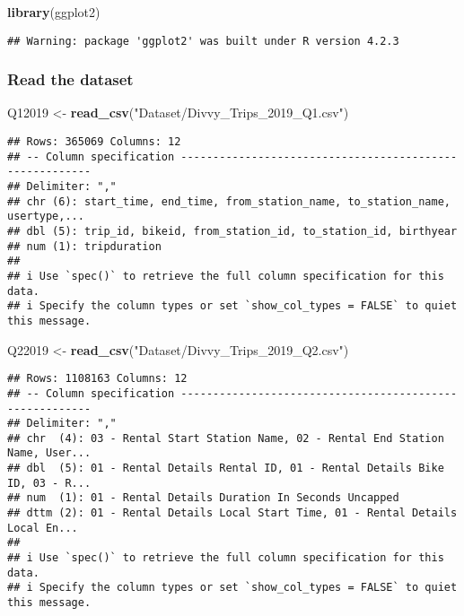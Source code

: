 \documentclass[
]{article}
\newenvironment{Shaded}{\begin{snugshade}}{\end{snugshade}}
\newcommand{\FunctionTok}[1]{\textcolor[rgb]{0.13,0.29,0.53}{\textbf{#1}}}
\newcommand{\NormalTok}[1]{#1}
\newcommand{\OtherTok}[1]{\textcolor[rgb]{0.56,0.35,0.01}{#1}}
\newcommand{\StringTok}[1]{\textcolor[rgb]{0.31,0.60,0.02}{#1}}
\begin{document}
\begin{Shaded}
\begin{Highlighting}[]
\FunctionTok{library}\NormalTok{(ggplot2)}
\end{Highlighting}
\end{Shaded}

\begin{verbatim}
## Warning: package 'ggplot2' was built under R version 4.2.3
\end{verbatim}

\hypertarget{read-the-dataset}{%
\subsubsection{Read the dataset}\label{read-the-dataset}}

\begin{Shaded}
\begin{Highlighting}[]
\NormalTok{Q12019 }\OtherTok{\textless{}{-}} \FunctionTok{read\_csv}\NormalTok{(}\StringTok{"Dataset/Divvy\_Trips\_2019\_Q1.csv"}\NormalTok{)}
\end{Highlighting}
\end{Shaded}

\begin{verbatim}
## Rows: 365069 Columns: 12
## -- Column specification --------------------------------------------------------
## Delimiter: ","
## chr (6): start_time, end_time, from_station_name, to_station_name, usertype,...
## dbl (5): trip_id, bikeid, from_station_id, to_station_id, birthyear
## num (1): tripduration
## 
## i Use `spec()` to retrieve the full column specification for this data.
## i Specify the column types or set `show_col_types = FALSE` to quiet this message.
\end{verbatim}

\begin{Shaded}
\begin{Highlighting}[]
\NormalTok{Q22019 }\OtherTok{\textless{}{-}} \FunctionTok{read\_csv}\NormalTok{(}\StringTok{"Dataset/Divvy\_Trips\_2019\_Q2.csv"}\NormalTok{)}
\end{Highlighting}
\end{Shaded}

\begin{verbatim}
## Rows: 1108163 Columns: 12
## -- Column specification --------------------------------------------------------
## Delimiter: ","
## chr  (4): 03 - Rental Start Station Name, 02 - Rental End Station Name, User...
## dbl  (5): 01 - Rental Details Rental ID, 01 - Rental Details Bike ID, 03 - R...
## num  (1): 01 - Rental Details Duration In Seconds Uncapped
## dttm (2): 01 - Rental Details Local Start Time, 01 - Rental Details Local En...
## 
## i Use `spec()` to retrieve the full column specification for this data.
## i Specify the column types or set `show_col_types = FALSE` to quiet this message.
\end{verbatim}
\end{document}
